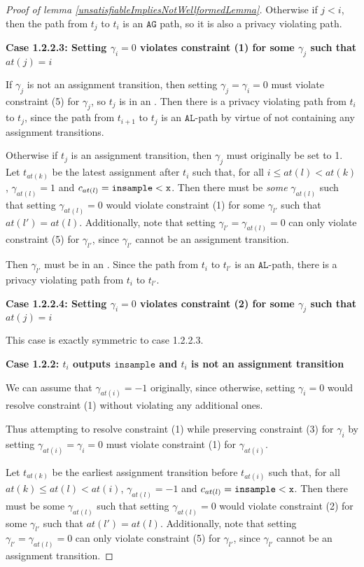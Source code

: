 \begin{proof}[Proof of lemma \ref{unsatisfiableImpliesNotWellformedLemma}]
    Otherwise if $j<i$, then the path from $t_j$ to $t_i$ is an $\texttt{AG}$ path, so it is also a privacy violating path.

    \textbf{Case 1.2.2.3: Setting $\gamma_i =0$ violates constraint (1) for some $\gamma_j$ such that $at(j) = i$}

    If $\gamma_j$ is not an assignment transition, then setting $\gamma_j = \gamma_i = 0$ must violate constraint (5) for $\gamma_j$, so $t_j$ is in an \lcycle. Then there is a privacy violating path from $t_i$ to $t_j$, since the path from $t_{i+1}$ to $t_j$ is an $\texttt{AL}$-path by virtue of not containing any assignment transitions. 

    Otherwise if $t_j$ is an assignment transition, then $\gamma_j$ must originally be set to 1. Let $t_{at(k)}$ be the latest assignment after $t_{i}$ such that, for all $i\leq at(l)< at(k)$, $\gamma_{at(l)} = 1$ and $c_{at(l)} = \lguard[\texttt{x}]$. Then there must be \textit{some} $\gamma_{at(l)}$ such that setting $\gamma_{at(l)} = 0$ would violate constraint (1) for some $\gamma_{l'}$ such that $at(l') = at(l)$.  
    Additionally, note that setting $\gamma_{l'} = \gamma_{at(l)} = 0$ can only violate constraint (5) for $\gamma_{l'}$, since $\gamma_{l'}$ cannot be an assignment transition. 

    Then $\gamma_{l'}$ must be in an \lcycle. Since the path from $t_i$ to $t_{l'}$ is an $\texttt{AL}$-path, there is a privacy violating path from $t_i$ to $t_{l'}$.

    \textbf{Case 1.2.2.4: Setting $\gamma_i =0$ violates constraint (2) for some $\gamma_j$ such that $at(j) = i$}

    This case is exactly symmetric to case 1.2.2.3.

    \textbf{Case 1.2.2: $t_i$ outputs $\texttt{insample}$ and $t_i$ is not an assignment transition}

    We can assume that $\gamma_{at(i)} = -1$ originally, since otherwise, setting $\gamma_i = 0$ would resolve constraint (1) without violating any additional ones.

    Thus attempting to resolve constraint (1) while preserving constraint (3) for $\gamma_i$ by setting $\gamma_{at(i)}=\gamma_i =0$ must violate constraint (1) for $\gamma_{at(i)}$. 
   
    Let $t_{at(k)}$ be the earliest assignment transition before $t_{at(i)}$ such that, for all $at(k)\leq at(l)< at(i)$, $\gamma_{at(l)} = -1$ and $c_{at(l)} = \lguard[\texttt{x}]$. Then there must be some $\gamma_{at(l)}$ such that setting $\gamma_{at(l)} = 0$ would violate constraint (2) for some $\gamma_{l'}$ such that $at(l') = at(l)$.  
    Additionally, note that setting $\gamma_{l'} = \gamma_{at(l)} = 0$ can only violate constraint (5) for $\gamma_{l'}$, since $\gamma_{l'}$ cannot be an assignment transition. 
    

\end{proof}
